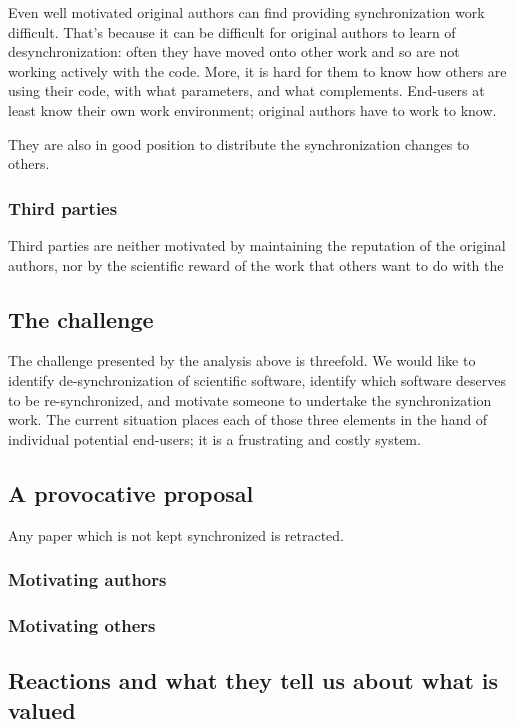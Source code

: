 \documentclass{sigchi}
\begin{document}
Even well motivated original authors can find providing synchronization work difficult. That's because it can be difficult for original authors to learn of desynchronization: often they have moved onto other work and so are not working actively with the code.  More, it is hard for them to know how others are using their code, with what parameters, and what complements. End-users at least know their own work environment; original authors have to work to know.

They are also in good position to distribute the synchronization changes to others.

\subsubsection{Third parties}

Third parties are neither motivated by maintaining the reputation of the original authors, nor by the scientific reward of the work that others want to do with the 

\subsection{The challenge}

The challenge presented by the analysis above is threefold.  We would like to identify de-synchronization of scientific software, identify which software deserves to be re-synchronized, and motivate someone to undertake the synchronization work.  The current situation places each of those three elements in the hand of individual potential end-users; it is a frustrating and costly system.

\subsection{A provocative proposal}

Any paper which is not kept synchronized is retracted.

\subsubsection{Motivating authors}
\subsubsection{Motivating others}

\subsection{Reactions and what they tell us about what is valued}
\end{document}
